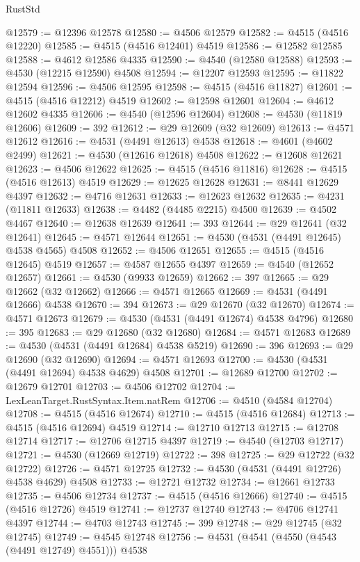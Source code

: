 \begin{lexlean}{RustStd}
\begin{coremodule}
{\begin{coremodule}
{{{{{{{{{{{{{{{{{{{{{{{{{{{{{{{{{{{{{{{{{{{{{{{{{{{{{{{@12579 := @12396 @12578
@12580 := @4506 @12579
@12582 := @4515 (@4516 @12220)
@12585 := @4515 (@4516 @12401) @4519
@12586 := @12582 @12585
@12588 := @4612 @12586 @4335
@12590 := @4540 (@12580 @12588)
@12593 := @4530 (@12215 @12590) @4508
@12594 := @12207 @12593
@12595 := @11822 @12594
@12596 := @4506 @12595
@12598 := @4515 (@4516 @11827)
@12601 := @4515 (@4516 @12212) @4519
@12602 := @12598 @12601
@12604 := @4612 @12602 @4335
@12606 := @4540 (@12596 @12604)
@12608 := @4530 (@11819 @12606)
@12609 := 392
@12612 := @29 @12609 (@32 @12609)
@12613 := @4571 @12612
@12616 := @4531 (@4491 @12613) @4538
@12618 := @4601 (@4602 @2499)
@12621 := @4530 (@12616 @12618) @4508
@12622 := @12608 @12621
@12623 := @4506 @12622
@12625 := @4515 (@4516 @11816)
@12628 := @4515 (@4516 @12613) @4519
@12629 := @12625 @12628
@12631 := @8441 @12629 @4397
@12632 := @4716 @12631
@12633 := @12623 @12632
@12635 := @4231 (@11811 @12633)
@12638 := @4482 (@4485 @2215) @4500
@12639 := @4502 @4467
@12640 := @12638 @12639
@12641 := 393
@12644 := @29 @12641 (@32 @12641)
@12645 := @4571 @12644
@12651 := @4530 (@4531 (@4491 @12645) @4538 @4565) @4508
@12652 := @4506 @12651
@12655 := @4515 (@4516 @12645) @4519
@12657 := @4587 @12655 @4397
@12659 := @4540 (@12652 @12657)
@12661 := @4530 (@9933 @12659)
@12662 := 397
@12665 := @29 @12662 (@32 @12662)
@12666 := @4571 @12665
@12669 := @4531 (@4491 @12666) @4538
@12670 := 394
@12673 := @29 @12670 (@32 @12670)
@12674 := @4571 @12673
@12679 := @4530 (@4531 (@4491 @12674) @4538 @4796)
@12680 := 395
@12683 := @29 @12680 (@32 @12680)
@12684 := @4571 @12683
@12689 := @4530 (@4531 (@4491 @12684) @4538 @5219)
@12690 := 396
@12693 := @29 @12690 (@32 @12690)
@12694 := @4571 @12693
@12700 := @4530 (@4531 (@4491 @12694) @4538 @4629) @4508
@12701 := @12689 @12700
@12702 := @12679 @12701
@12703 := @4506 @12702
@12704 := LexLeanTarget.RustSyntax.Item.natRem
@12706 := @4510 (@4584 @12704)
@12708 := @4515 (@4516 @12674)
@12710 := @4515 (@4516 @12684)
@12713 := @4515 (@4516 @12694) @4519
@12714 := @12710 @12713
@12715 := @12708 @12714
@12717 := @12706 @12715 @4397
@12719 := @4540 (@12703 @12717)
@12721 := @4530 (@12669 @12719)
@12722 := 398
@12725 := @29 @12722 (@32 @12722)
@12726 := @4571 @12725
@12732 := @4530 (@4531 (@4491 @12726) @4538 @4629) @4508
@12733 := @12721 @12732
@12734 := @12661 @12733
@12735 := @4506 @12734
@12737 := @4515 (@4516 @12666)
@12740 := @4515 (@4516 @12726) @4519
@12741 := @12737 @12740
@12743 := @4706 @12741 @4397
@12744 := @4703 @12743
@12745 := 399
@12748 := @29 @12745 (@32 @12745)
@12749 := @4545 @12748
@12756 := @4531 (@4541 (@4550 (@4543 (@4491 @12749) @4551))) @4538
}}}}}}}}}}}}}}}}}}}}}}}}}}}}}}}}}}}}}}}}}}}}}}}}}}}}}}}
\end{coremodule}}
\end{coremodule}
\end{lexlean}
